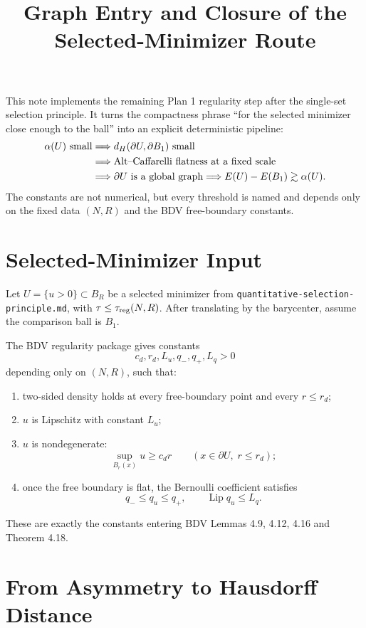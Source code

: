 \documentclass[11pt]{article}
\title{Graph Entry and Closure of the Selected-Minimizer Route}
\author{}
\date{}
\begin{document}
\maketitle

This note implements the remaining Plan 1 regularity step after the
single-set selection principle. It turns the compactness phrase ``for the
selected minimizer close enough to the ball'' into an explicit deterministic
pipeline:
\[
\begin{aligned}
\alpha(U)\hbox{ small}
&\Longrightarrow
d_H(\partial U,\partial B_1)\hbox{ small} \\
&\Longrightarrow
\hbox{Alt--Caffarelli flatness at a fixed scale} \\
&\Longrightarrow
\partial U\hbox{ is a global graph}
\Longrightarrow
E(U)-E(B_1)\gtrsim \alpha(U).
\end{aligned}
\]
The constants are not numerical, but every threshold is named and depends only
on the fixed data \((N,R)\) and the BDV free-boundary constants.

\section{Selected-Minimizer Input}

Let \(U=\{u>0\}\subset B_R\) be a selected minimizer from
\texttt{quantitative-selection-principle.md}, with
\(\tau\le\tau_{\rm reg}(N,R)\). After translating by the barycenter, assume the
comparison ball is \(B_1\).

The BDV regularity package gives constants
\[
c_d,r_d,L_u,q_-,q_+,L_q>0
\]
depending only on \((N,R)\), such that:
\begin{enumerate}
\item two-sided density holds at every free-boundary point and every
\(r\le r_d\);
\item \(u\) is Lipschitz with constant \(L_u\);
\item \(u\) is nondegenerate:
\[
\sup_{B_r(x)}u\ge c_d r
\qquad(x\in\partial U,\;r\le r_d);
\]
\item once the free boundary is flat, the Bernoulli coefficient satisfies
\[
q_-\le q_u\le q_+,\qquad \operatorname{Lip} q_u\le L_q.
\]
\end{enumerate}
These are exactly the constants entering BDV Lemmas 4.9, 4.12, 4.16 and
Theorem 4.18.

\section{From Asymmetry to Hausdorff Distance}
\end{document}
